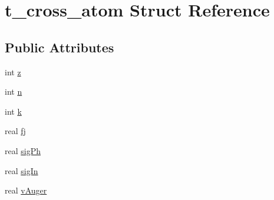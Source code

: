 \hypertarget{structt__cross__atom}{\section{t\-\_\-cross\-\_\-atom \-Struct \-Reference}
\label{structt__cross__atom}
}
\subsection*{\-Public \-Attributes}
\begin{DoxyCompactItemize}
\item 
int \hyperlink{structt__cross__atom_a3e2bc01913e66a2a0ec143b40ff1e221}{z}
\item 
int \hyperlink{structt__cross__atom_a413528946236befa7fd1eb4edeeb24e7}{n}
\item 
int \hyperlink{structt__cross__atom_ae839b46f46da0b21bd3468a52c9a5fe7}{k}
\item 
real \hyperlink{structt__cross__atom_ab59d8a5a75152d91378e44abc69d5bf4}{fj}
\item 
real \hyperlink{structt__cross__atom_a2e689e95b037415137bbca88432c1fc4}{sig\-Ph}
\item 
real \hyperlink{structt__cross__atom_a5a3f2655034ee147b8b5998d9795eca6}{sig\-In}
\item 
real \hyperlink{structt__cross__atom_a6617776a5a4f0b581aef65c89cd594ab}{v\-Auger}
\end{DoxyCompactItemize}


